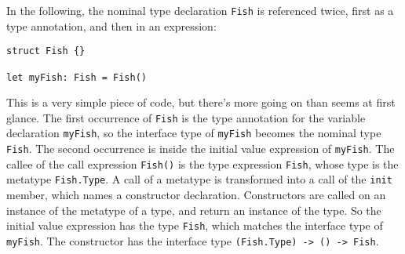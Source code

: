 \documentclass[a4paper,headsepline,bibliography=totoc,toc=flat,fleqn,twoside=semi]{scrbook}
\theoremstyle{definition}
\theoremstyle{definition}
\theoremstyle{definition}
\begin{document}
In the following, the nominal type declaration \texttt{Fish} is referenced twice, first as a type annotation, and then in an expression:
\begin{Verbatim}
struct Fish {}

let myFish: Fish = Fish()
\end{Verbatim}
This is a very simple piece of code, but there's more going on than seems at first glance. The first occurrence of \texttt{Fish} is the type annotation for the variable declaration \texttt{myFish}, so the interface type of \texttt{myFish} becomes the nominal type \texttt{Fish}. The second occurrence is inside the initial value expression of \texttt{myFish}. The callee of the call expression \texttt{Fish()} is the type expression \texttt{Fish}, whose type is the metatype \texttt{Fish.Type}. A call of a metatype is transformed into a call of the \texttt{init} member, which names a constructor declaration. Constructors are called on an instance of the metatype of a type, and return an instance of the type. So the initial value expression has the type \texttt{Fish}, which matches the interface type of \texttt{myFish}. The constructor has the interface type \verb|(Fish.Type) -> () -> Fish|.
\end{document}
